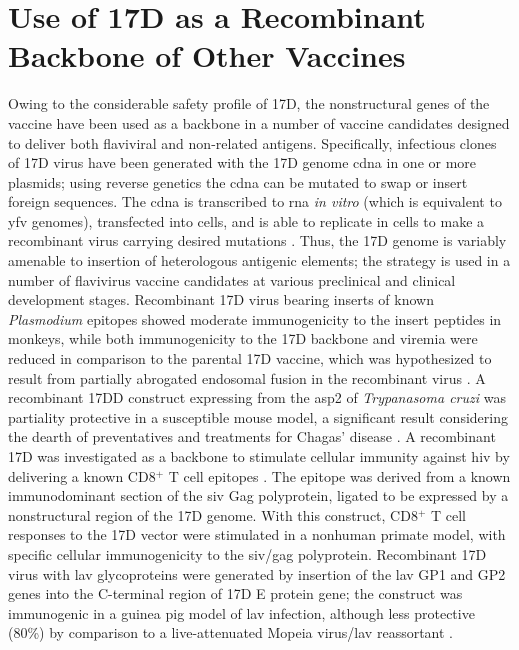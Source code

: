 \section{Use of 17D as a Recombinant Backbone of Other Vaccines}
Owing to the considerable safety profile of 17D, the nonstructural genes of the vaccine have been used as a backbone in a number of vaccine candidates designed to deliver both flaviviral and non-related antigens. Specifically, infectious clones of 17D virus have been generated with the 17D genome \gls{cdna} in one or more plasmids; using reverse genetics the \gls{cdna} can be mutated to swap or insert foreign sequences. The \gls{cdna} is transcribed to \gls{rna} \emph{in vitro} (which is equivalent to \gls{yfv} genomes), transfected into cells, and is able to replicate in cells to make a recombinant virus carrying desired mutations \parencite{Rice:1989vo}. Thus, the 17D genome is variably amenable to insertion of heterologous antigenic elements; the strategy is used in a number of flavivirus vaccine candidates at various preclinical and clinical development stages.  Recombinant 17D virus bearing inserts of known \emph{Plasmodium} epitopes showed moderate immunogenicity to the insert peptides in monkeys, while both immunogenicity to the 17D backbone and viremia were reduced in comparison to the parental 17D vaccine, which was hypothesized to result from partially abrogated endosomal fusion in the recombinant virus \parencite{Bonaldo:2005ht}. A recombinant 17DD construct expressing from the \gls{asp2} of \emph{Trypanasoma cruzi} was partiality protective in a susceptible mouse model, a significant result considering the dearth of preventatives and treatments for Chagas’ disease \parencite{Nogueira:2013kj}. A recombinant 17D was investigated as a backbone to stimulate cellular immunity against \gls{hiv} by delivering a known CD8$^+$ T cell epitopes \parencite{Bonaldo:2010ey}. The epitope was derived from a known immunodominant section of the \gls{siv} Gag polyprotein, ligated to be expressed by a nonstructural region of the 17D genome. With this construct, CD8$^+$ T cell responses to the 17D vector were stimulated in a nonhuman primate model, with specific cellular immunogenicity to the \gls{siv}/gag polyprotein. Recombinant 17D virus with \gls{lav} glycoproteins were generated by insertion of the \gls{lav} GP1 and GP2 genes into the C-terminal region of 17D E protein gene; the construct was immunogenic in a guinea pig model of \gls{lav} infection, although less protective (80\%) by comparison to a live-attenuated Mopeia virus/\gls{lav} reassortant \parencite{Bredenbeek:2006fq}.

